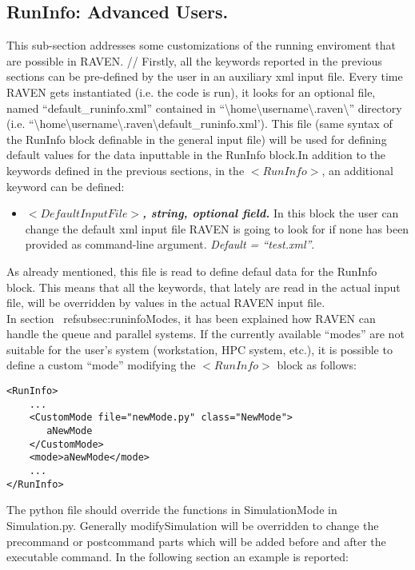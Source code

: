 \subsection{RunInfo: Advanced Users.}
\label{subsec:runinfoadvanced}
This sub-section addresses some customizations of the running enviroment that are possible in RAVEN.
// Firstly, all the keywords reported in the previous sections can be pre-defined by the user in an auxiliary xml input file. Every time RAVEN gets instantiated (i.e. the code is run), it looks for an optional file, named ``default\_runinfo.xml'' contained in ``\textbackslash home\textbackslash username\textbackslash.raven\textbackslash '' directory (i.e. ``\textbackslash home\textbackslash username\textbackslash.raven\textbackslash default\_runinfo.xml'). This file (same syntax of the RunInfo block definable in the general input file) will be used for defining default values for the data inputtable in the RunInfo block.In addition to the keywords defined in the previous sections, in the $<RunInfo>$, an additional keyword can be defined:
\begin{itemize}
\item $<DefaultInputFile>$\textbf{\textit{, string, optional field.}} In this block the user can change the default xml input file RAVEN is going to look for if none has been provided as command-line argument. \textit{Default = ``test.xml''}.
\end{itemize}
As already mentioned, this file is read to define defaul data for the RunInfo block. This means that all the keywords, that lately are read in the actual input file, will be overridden by values in the actual RAVEN input file.
\\ In section ~ref{subsec:runinfoModes}, it has been explained how RAVEN can handle the queue and parallel systems. If the currently available ``modes'' are not suitable for the user's system (workstation, HPC system, etc.), it is possible to define a custom ``mode'' modifying the $<RunInfo>$ block as follows:
\begin{lstlisting}[style=XML]
<RunInfo>
    ...
    <CustomMode file="newMode.py" class="NewMode">
       aNewMode
    </CustomMode>    
    <mode>aNewMode</mode>
    ...
</RunInfo>
\end{lstlisting}

The python file should override the functions in SimulationMode in
Simulation.py.  Generally modifySimulation will be overridden to
change the precommand or postcommand parts which will be added before
and after the executable command. In the following section an example is reported:


